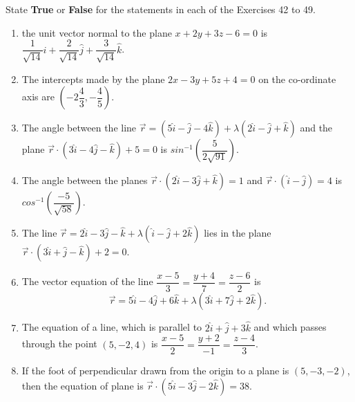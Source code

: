 \documentclass[12pt]{article}
\providecommand{\brak}[1]{\ensuremath{\left(#1\right)}}
\begin{document}
State \textbf{True} or \textbf{False} for the statements in each of the Exercises 42 to 49.
\begin{enumerate}[resume]
\item the unit vector normal to the plane $x+2y+3z-6=0$ is $\dfrac{1}{\sqrt{14}}\hat{i} + \dfrac{2}{\sqrt{14}}\hat{j} + \dfrac{3}{\sqrt{14}}\hat{k}$.
\item The intercepts made by the plane $2x-3y+5z+4=0$ on the co-ordinate axis are $\brak{-2 \dfrac{4}{3},-\dfrac{4}{5}}$.
\item The angle between the line $\overrightarrow{r}=(5\hat{i}-\hat{j}-4\hat{k})+\lambda(2\hat{i}-\hat{j}+\hat{k})$ and the plane $\overrightarrow{r} \cdot (3\hat{i}-4\hat{j}-\hat{k})+5=0$ is $sin^{-1}\brak{\dfrac{5}{2\sqrt{91}}}$.
\item The angle between the planes $\overrightarrow{r} \cdot (2\hat{i}-3\hat{j}+\hat{k})=1$ and $\overrightarrow{r} \cdot (\hat{i}-\hat{j})=4$ is $cos^{-1} \brak{\dfrac{-5}{\sqrt{58}}}$.
\item The line $\overrightarrow{r}=2\hat{i}-3\hat{j}-\hat{k}+\lambda(\hat{i}-\hat{j}+2\hat{k})$ lies in the plane $\overrightarrow{r} \cdot (3\hat{i}+\hat{j}-\hat{k})+2=0$.
\item The vector equation of the line $\dfrac{x-5}{3}=\dfrac{y+4}{7}=\dfrac{z-6}{2}$ is
$$\overrightarrow{r}=5\hat{i}-4\hat{j}+6\hat{k}+\lambda(3\hat{i}+7\hat{j}+2\hat{k}).$$
\item The equation of a line, which is parallel to $2\hat{i}+\hat{j}+3\hat{k}$ and which passes through the point $(5,-2,4)$ is $\dfrac{x-5}{2}=\dfrac{y+2}{-1}=\dfrac{z-4}{3}$.
\item If the foot of perpendicular drawn from the origin to a plane is $(5,-3,-2)$, then the equation of plane is $\overrightarrow{r} \cdot (5\hat{i}-3\hat{j}-2\hat{k})=38.$
\end{enumerate}
\end{document}
